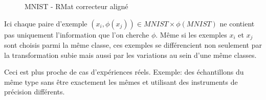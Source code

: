 \begin{figure}[H] %
\centering
{}
\hfill
{}
\caption{MNIST - RMat correcteur aligné}
\label{fig:mnist_rmat_pairwise}
\end{figure}



Ici chaque paire d'exemple $(x_i, \phi(x_j)) \in MNIST\times \phi(MNIST)$
ne contient pas uniquement l'information que l'on cherche $\phi$. Même si
les exemples $x_i$ et $x_j$ sont choisis parmi la même classe, ces exemples 
se différencient non seulement par la transformation subie mais aussi par 
les variations au sein d'une même classes.

Ceci est plus proche de cas d'expériences réels. Exemple: des échantillons
du même type sans être exactement les mêmes et utilisant des instruments
de précision différents.


